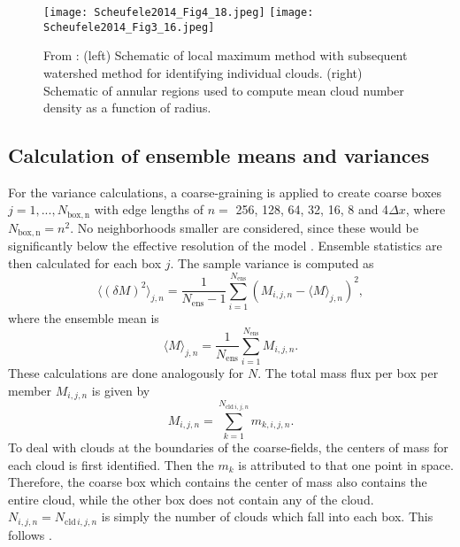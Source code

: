 \documentclass[a4paper, 12pt]{article}
\begin{document}
\begin{figure}[ht]
\noindent \centering
\texttt{[image: Scheufele2014\_Fig4\_18.jpeg]}
\texttt{[image: Scheufele2014\_Fig3\_16.jpeg]}\\
\caption{From \cite{Scheufele2014}: (left) Schematic of local maximum method with subsequent watershed method for identifying individual clouds. (right) Schematic of annular regions used to compute mean cloud number density as a function of radius.} \label{fig:Scheufele2014}
\end{figure}


\subsection{Calculation of ensemble means and variances}
For the variance calculations, a coarse-graining is applied to create coarse boxes $j=1,...,N_{\mathrm{box,n}}$ with edge lengths of $n=$ 256, 128, 64, 32, 16, 8 and 4$\Delta x$, where $N_{\mathrm{box,n}}=n^2$. No neighborhoods smaller are considered, since these would be significantly below the effective resolution of the model \citep{Bierdel2012}. Ensemble statistics are then calculated for each box $j$. The sample variance is computed as
\begin{equation} \label{eq:calc_varM}
 \langle (\delta M )^2 \rangle_{j,n} = \frac{1}{N_{\mathrm{ens}}-1} \sum_{i=1}^{N_{\mathrm{ens}}} (M_{i,j,n} - \langle M \rangle_{j,n})^2,
\end{equation}
where the ensemble mean is
\begin{equation} \label{eq:calc_meanM}
 \langle M \rangle_{j,n} = \frac{1}{N_{\mathrm{ens}}} \sum_{i=1}^{N_{\mathrm{ens}}} M_{i,j,n}.
\end{equation}
These calculations are done analogously for $N$. The total mass flux per box per member $M_{i,j,n}$ is given by
\begin{equation} \label{eq:calc_memM}
 M_{i,j,n} = \sum_{k=1}^{N_{\mathrm{cld}\,i,j,n}} m_{k,i,j,n}.
\end{equation}
To deal with clouds at the boundaries of the coarse-fields, the centers of mass for each cloud is first identified. Then the $m_k$ is attributed to that one point in space. Therefore, the coarse box which contains the center of mass also contains the entire cloud, while the other box does not contain any of the cloud. $N_{i,j,n}=N_{\mathrm{cld}\,i,j,n}$ is simply the number of clouds which fall into each box. This follows \cite{Cohen2006}.
\end{document}

